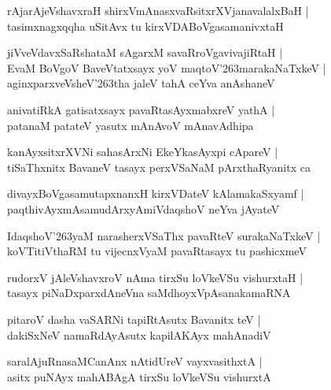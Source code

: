 \documentclass[twoside,12pt,openright]{book}
\def\S{\char'263}
\newcounter{shloka}[chapter]
\begin{document}
\begin{shloka}
rAjarAjeVshavxraH shirxVmAnasxvaRsitxrXVjanavalalxBaH |\\
tasimxnagxqqha uSitAvx tu kirxVDABoVgasamanivxtaH
\end{shloka}

\begin{shloka}
jiVveVdavxSaRshataM sAgarxM savaRroVgavivajiRtaH |\\
EvaM BoVgoV BaveVtatxsayx yoV maqtoV\S marakaNaTxkeV |\\
aginxparxveVsheV\S tha jaleV tahA ceYva anAshaneV 
\end{shloka}

\begin{shloka}
anivatiRkA gatisatxsayx pavaRtasAyxmabxreV yathA |\\
patanaM patateV yasutx mAnAvoV mAnavAdhipa
\end{shloka}

\begin{shloka}
kanAyxsitxrXVNi sahasArxNi EkeYkasAyxpi cApareV |\\
tiSaThxnitx BavaneV tasayx perxVSaNaM pArxthaRyanitx ca 
\end{shloka}

\begin{shloka}
divayxBoVgasamutapxnanxH kirxVDateV kAlamakaSxyamf |\\
paqthivAyxmAsamudArxyAmiVdaqshoV neYva jAyateV 
\end{shloka}

\begin{shloka}
IdaqshoV\S yaM narasherxVSaThx pavaRteV surakaNaTxkeV |\\
koVTitiVthaRM tu vijecnxVyaM pavaRtasayx tu pashicxmeV  
\end{shloka}

\begin{shloka}
rudorxV jAleVshavxroV nAma tirxSu loVkeVSu vishurxtaH |\\
tasayx piNaDxparxdAneVna saMdhoyxVpAsanakamaRNA
\end{shloka}

\begin{shloka}
pitaroV dasha vaSARNi tapiRtAsutx Bavanitx teV |\\
dakiSxNeV namaRdAyAsutx kapilAKAyx mahAnadiV 
\end{shloka}

\begin{shloka}
saralAjuRnasaMCanAnx nAtidUreV vayxvasithxtA |\\
asitx puNAyx mahABAgA tirxSu loVkeVSu vishurxtA
\end{shloka}
\end{document}
